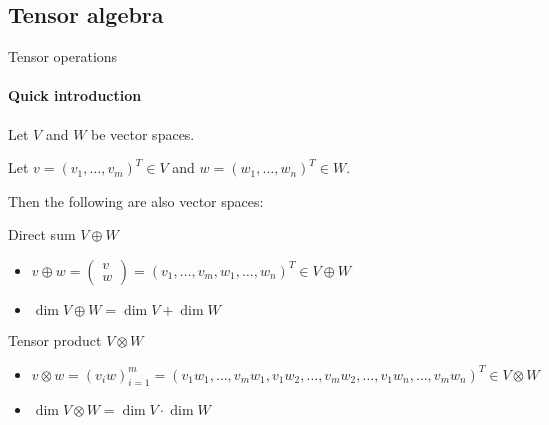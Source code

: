 \documentclass[handout, 10pt]{beamer}
\begin{document}
	\subsection{Tensor algebra}
	
	\begin{frame}{Tensor operations}
		\framesubtitle{Quick introduction}
		
		Let $V$ and $W$ be vector spaces.
		
		Let $v = (v_1, \dots, v_m)^T \in V$ and $w = (w_1, \dots, w_n)^T \in W$. 
		
		Then the following are also vector spaces:
		
		\vfill
		
		\begin{exampleblock}{Direct sum $V \oplus W$}
			\begin{itemize}
				\item $v \oplus w = \begin{pmatrix}
					v \\ w
				\end{pmatrix} = (v_1, \dots, v_m, w_1, \dots, w_n)^T \in V \oplus W$
				\item $\dim V \oplus W = \dim V + \dim W$
			\end{itemize}
		\end{exampleblock}
		\vfill
		\begin{exampleblock}{Tensor product $V \otimes W$}
			\begin{itemize}
				\item $v \otimes w = (v_iw)_{i=1}^{m} = (v_1 w_1, \dots, v_m w_1, v_1 w_2, \dots, v_m w_2, \dots, v_1 w_n, \dots, v_m w_n)^T \in V \otimes W$
				\item $\dim V \otimes W = \dim V \cdot \dim W$
			\end{itemize}
		\end{exampleblock}		
	\end{frame}
	
\end{document}
